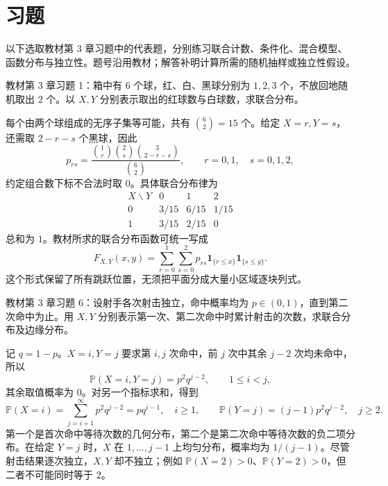 \section*{习题}

以下选取教材第 3 章习题中的代表题，分别练习联合计数、条件化、混合模型、函数分布与独立性。题号沿用教材；解答补明计算所需的随机抽样或独立性假设。

\begin{example}
\label{ex:study-ch3-exercise-1}
教材第 3 章习题 1：箱中有 $6$ 个球，红、白、黑球分别为 $1,2,3$ 个，不放回地随机取出 $2$ 个。以 $X,Y$ 分别表示取出的红球数与白球数，求联合分布。
\end{example}

\begin{solve}
每个由两个球组成的无序子集等可能，共有 $\binom62=15$ 个。给定 $X=r,Y=s$，还需取 $2-r-s$ 个黑球，因此
\[
  p_{rs}=\frac{\binom1r\binom2s\binom3{2-r-s}}{\binom62},
  \qquad r=0,1,\quad s=0,1,2,
\]
约定组合数下标不合法时取 $0$。具体联合分布律为
\[
  \begin{array}{c|ccc}
    X\backslash Y&0&1&2\\\hline
    0&3/15&6/15&1/15\\
    1&3/15&2/15&0
  \end{array}
\]
总和为 $1$。教材所求的联合分布函数可统一写成
\[
  F_{X,Y}(x,y)=\sum_{r=0}^1\sum_{s=0}^2
    p_{rs}\boldsymbol 1_{\{r\le x\}}\boldsymbol 1_{\{s\le y\}}.
\]
这个形式保留了所有跳跃位置，无须把平面分成大量小区域逐块列式。
\end{solve}

\begin{example}
\label{ex:study-ch3-exercise-6}
教材第 3 章习题 6：设射手各次射击独立，命中概率均为 $p\in(0,1)$，直到第二次命中为止。用 $X,Y$ 分别表示第一次、第二次命中时累计射击的次数，求联合分布及边缘分布。
\end{example}

\begin{solve}
记 $q=1-p$。$X=i,Y=j$ 要求第 $i,j$ 次命中，前 $j$ 次中其余 $j-2$ 次均未命中，所以
\[
  \mathbb P(X=i,Y=j)=p^2q^{j-2},\qquad1\le i<j,
\]
其余取值概率为 $0$。对另一个指标求和，得到
\[
  \mathbb P(X=i)=\sum_{j=i+1}^\infty p^2q^{j-2}=pq^{i-1},\quad i\ge1,
  \qquad
  \mathbb P(Y=j)=(j-1)p^2q^{j-2},\quad j\ge2.
\]
第一个是首次命中等待次数的几何分布，第二个是第二次命中等待次数的负二项分布。在给定 $Y=j$ 时，$X$ 在 $1,\ldots,j-1$ 上均匀分布，概率均为 $1/(j-1)$。尽管射击结果逐次独立，$X,Y$ 却不独立；例如 $\mathbb P(X=2)>0$、$\mathbb P(Y=2)>0$，但二者不可能同时等于 $2$。
\end{solve}

